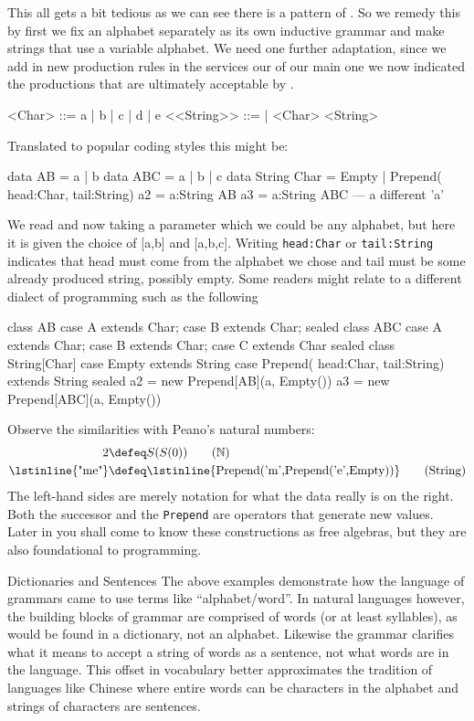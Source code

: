 This all gets a bit tedious as we can see there is a pattern of
.  So we remedy this by first we fix an alphabet
separately as its own inductive grammar and make strings that use a variable alphabet.
We need one further adaptation, since we add in new production rules in 
the services our of our main one we now indicated the productions 
that are ultimately acceptable by .
\begin{Gcode}[]
<Char> ::= a | b | c | d | e
<<String>> ::= 
           | <Char> <String>
\end{Gcode}
Translated to popular coding styles this might be:
\begin{Fcode}[]
data AB = a | b
data ABC = a | b | c 
data String Char = Empty 
            | Prepend( head:Char, tail:String) 
a2 = a:String AB
a3 = a:String ABC --- a different 'a'
\end{Fcode}
We read  and now taking a parameter 
which we could be any alphabet, but here it is given the 
choice of [a,b] and [a,b,c].
Writing \lstinline{head:Char} or \lstinline{tail:String} 
indicates that head must come from the alphabet we chose 
and tail must be some already produced string, possibly empty.
Some readers might relate to a different dialect of 
programming such as the following
\begin{Pcode}[]
class AB
  case A extends Char;  case B extends Char;
sealed
class ABC
  case A extends Char;  case B extends Char;
  case C extends Char
sealed
class String[Char]
  case Empty extends String
  case Prepend( head:Char, tail:String) extends String
sealed
a2 = new Prepend[AB](a, Empty())
a3 = new Prepend[ABC](a, Empty())
\end{Pcode}
Observe the similarities with Peano's natural numbers:
\begin{align}
     2 & \defeq S(S(0)) \tag{$\mathbb{N}$}\\
 \text{\lstinline{"me"}} & \defeq \text{\lstinline{Prepend('m',Prepend('e',Empty))}}
\tag{String}
\end{align}
The left-hand sides are merely notation for what the data really is on the right.
Both the successor and the \lstinline{Prepend} are operators that generate 
new values.  Later in you shall come to know these constructions as free algebras,
but they are also foundational to programming.



\begin{remark}{Dictionaries and Sentences}
    The above examples demonstrate how the language of grammars came to 
    use terms like ``alphabet/word''. 
    In natural languages however, the building blocks of grammar are comprised of words (or
    at least syllables), as would be found in a dictionary, not an alphabet.  
    Likewise the grammar clarifies what it means to accept a string of words as a sentence,
    not what words are in the language. This offset in vocabulary better 
    approximates the tradition of languages like Chinese
    where entire words can be characters in the alphabet and strings of
    characters are sentences.
\end{remark}

